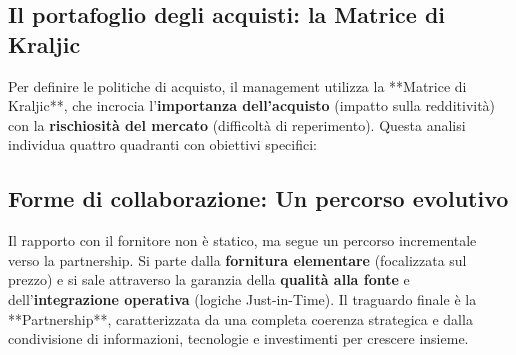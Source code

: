 \documentclass[a4paper,10pt]{article}
\begin{document}
\subsection*{Il portafoglio degli acquisti: la Matrice di Kraljic}

Per definire le politiche di acquisto, il management utilizza la **Matrice di Kraljic**, che incrocia l'\textbf{importanza dell'acquisto} (impatto sulla redditività) con la \textbf{rischiosità del mercato} (difficoltà di reperimento). Questa analisi individua quattro quadranti con obiettivi specifici:

\begin{table}[H]
\setlength{\extrarowheight}{10pt}
\caption{Politiche d'acquisto secondo la Matrice di Kraljic}
\end{table}

\subsection*{Forme di collaborazione: Un percorso evolutivo}

Il rapporto con il fornitore non è statico, ma segue un percorso incrementale verso la partnership. Si parte dalla \textbf{fornitura elementare} (focalizzata sul prezzo) e si sale attraverso la garanzia della \textbf{qualità alla fonte} e dell'\textbf{integrazione operativa} (logiche Just-in-Time). Il traguardo finale è la **Partnership**, caratterizzata da una completa coerenza strategica e dalla condivisione di informazioni, tecnologie e investimenti per crescere insieme.
\end{document}
